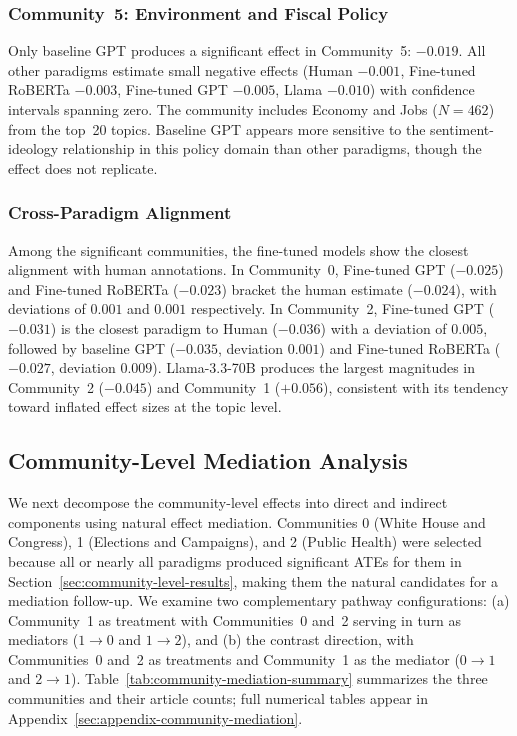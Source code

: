 \subsubsection{Community~5: Environment and Fiscal Policy}

Only baseline GPT produces a significant effect in Community~5: $-0.019$. All other paradigms estimate small negative effects (Human $-0.001$, Fine-tuned RoBERTa $-0.003$, Fine-tuned GPT $-0.005$, Llama $-0.010$) with confidence intervals spanning zero. The community includes Economy and Jobs ($N = 462$) from the top~20 topics. Baseline GPT appears more sensitive to the sentiment-ideology relationship in this policy domain than other paradigms, though the effect does not replicate.

\subsubsection{Cross-Paradigm Alignment}

Among the significant communities, the fine-tuned models show the closest alignment with human annotations. In Community~0, Fine-tuned GPT ($-0.025$) and Fine-tuned RoBERTa ($-0.023$) bracket the human estimate ($-0.024$), with deviations of $0.001$ and $0.001$ respectively. In Community~2, Fine-tuned GPT ($-0.031$) is the closest paradigm to Human ($-0.036$) with a deviation of $0.005$, followed by baseline GPT ($-0.035$, deviation $0.001$) and Fine-tuned RoBERTa ($-0.027$, deviation $0.009$). Llama-3.3-70B produces the largest magnitudes in Community~2 ($-0.045$) and Community~1 ($+0.056$), consistent with its tendency toward inflated effect sizes at the topic level.

\subsection{Community-Level Mediation Analysis}
\label{sec:community-mediation-results}

We next decompose the community-level effects into direct and indirect components using natural effect mediation. Communities 0 (White House and Congress), 1 (Elections and Campaigns), and 2 (Public Health) were selected because all or nearly all paradigms produced significant ATEs for them in Section~\ref{sec:community-level-results}, making them the natural candidates for a mediation follow-up. We examine two complementary pathway configurations: (a) Community~1 as treatment with Communities~0 and~2 serving in turn as mediators ($1 \to 0$ and $1 \to 2$), and (b) the contrast direction, with Communities~0 and~2 as treatments and Community~1 as the mediator ($0 \to 1$ and $2 \to 1$). Table~\ref{tab:community-mediation-summary} summarizes the three communities and their article counts; full numerical tables appear in Appendix~\ref{sec:appendix-community-mediation}.

